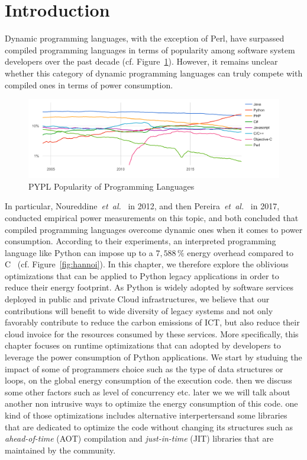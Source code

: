 
\section{Introduction}


Dynamic programming languages, with the exception of Perl, have surpassed compiled programming languages in terms of popularity among software system developers over the past decade (cf. Figure~\ref{fig:pypl}).
However, it remains unclear whether this category of dynamic programming languages can truly compete with compiled ones in terms of power consumption.
\begin{figure}[htbp]
    \includegraphics[width=\linewidth]{imgs/programminglanguangespopularity.png}
    \caption{PYPL Popularity of Programming Languages~\cite{noauthor_pypl_nodate}}
    \label{fig:pypl}
\end{figure}

In particular, Noureddine~\emph{et~al.}~\cite{noureddine_preliminary_2012} in 2012, and then Pereira~\emph{et~al.}~\cite{pereira_energy_2017} in 2017, conducted empirical power measurements on this topic, and both concluded that compiled programming languages overcome dynamic ones when it comes to power consumption.
According to their experiments, an interpreted programming language like Python can impose up to a $7,588\,\%$ energy overhead compared to C~\cite{pereira_energy_2017} (cf. Figure~\ref{fig:hannoi}).
In this chapter, we therefore explore the oblivious optimizations that can be applied to Python legacy applications in order to reduce their energy footprint.
As Python is widely adopted by software services deployed in public and private Cloud infrastructures, we believe that our contributions will benefit to wide diversity of legacy systems and not only favorably contribute to reduce the carbon emissions of ICT, but also reduce their cloud invoice for the resources consumed by these services.
More specifically, this chapter focuses on runtime optimizations that can adopted by developers to leverage the power consumption of Python applications.
We start by studuing the impact of some of programmers choice such as the type of data structures or loops, on the global energy consumption of the execution code.
then we discuss some other factors such as level of concurrency etc. later we we will talk about another non intrusive ways to optimize the energy consumption of this code. one kind of those optimizations includes alternative interpertersand some libraries that are dedicated to optimize the code without changing its structures such as \emph{ahead-of-time} (AOT) compilation and \emph{just-in-time} (JIT) libraries that are maintained by the community.

